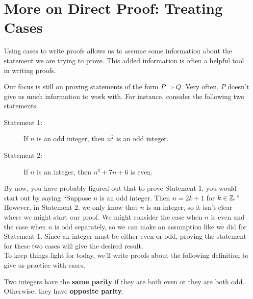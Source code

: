 
\chapter{More on Direct Proof: Treating Cases}

Using cases to write proofs allows us to assume some information about the statement we are trying to prove.  This added information is often a helpful tool in writing proofs.

\begin{center}
\end{center}

\noindent Our focus is still on proving statements of the form $P \Rightarrow Q$.  Very often, $P$ doesn't give us much information to work with.  For instance, consider the following two statements.
	\begin{description}
	\item[Statement 1:]  If $n$ is an odd integer, then $n^2$ is an odd integer.
	\item[Statement 2:]  If $n$ is an integer, then $n^2+7n+6$ is even.
	\end{description}
	
By now, you have probably figured out that to prove Statement 1, you would start out by saying ``Suppose $n$ is an odd integer.  Then $n=2k+1$ for $k \in \mathbb{Z}.$''  However, in Statement 2, we only know that $n$ is an integer, so it isn't clear where we might start our proof.  We might consider the case when $n$ is even and the case when $n$ is odd separately, so we can make an assumption like we did for Statement 1.  Since an integer must be either even or odd, proving the statement for these two cases will give the desired result.  \\

To keep things light for today, we'll write proofs about the following definition to give us practice with cases.

\begin{definition}[Parity]  Two integers have the \textbf{same parity} if they are both even or they are both odd.  Otherwise, they have \textbf{opposite parity}.
\end{definition}

